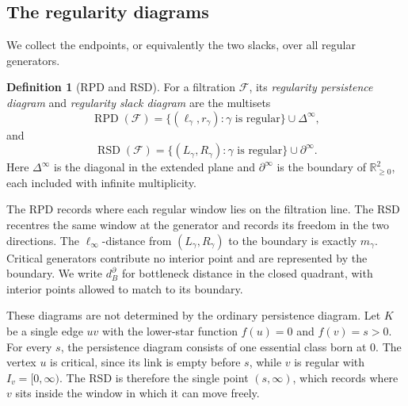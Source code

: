 \documentclass[11pt,letterpaper]{article}
\theoremstyle{definition}
\newtheorem{definition}[theorem]{Definition}
\newcommand{\RPD}{\operatorname{RPD}}
\newcommand{\RSD}{\operatorname{RSD}}
\begin{document}
\subsection{The regularity diagrams}

We collect the endpoints, or equivalently the two slacks, over all regular
generators.

\begin{definition}[RPD and RSD]
\label{def:rpd-rsd}
For a filtration $\mathcal F$, its \emph{regularity persistence diagram} and
\emph{regularity slack diagram} are the multisets
$$
\RPD(\mathcal F)
=\{(\ell_\gamma,r_\gamma):\gamma\text{ is regular}\}
  \cup\Delta^\infty,
$$
and
$$
\RSD(\mathcal F)
=\{(L_\gamma,R_\gamma):\gamma\text{ is regular}\}
  \cup\partial^\infty.
$$
Here $\Delta^\infty$ is the diagonal in the extended plane and
$\partial^\infty$ is the boundary of $\mathbb R_{\geq0}^2$, each included
with infinite multiplicity.
\end{definition}

The RPD records where each regular window lies on the filtration line. The RSD
recentres the same window at the generator and records its freedom in the two
directions. The $\ell_\infty$-distance from $(L_\gamma,R_\gamma)$ to the
boundary is exactly $m_\gamma$. Critical generators contribute no interior
point and are represented by the boundary. We write $d_B^\partial$ for
bottleneck distance in the closed quadrant, with interior points allowed to
match to its boundary.

These diagrams are not determined by the ordinary persistence diagram. Let $K$
be a single edge $uv$ with the lower-star function $f(u)=0$ and $f(v)=s>0$.
For every $s$, the persistence diagram consists of one essential class born
at $0$. The vertex $u$ is critical, since its link is empty before $s$, while
$v$ is regular with $I_v=[0,\infty)$. The RSD is therefore the single point
$(s,\infty)$, which records where $v$ sits inside the window in which it can
move freely.
\end{document}
